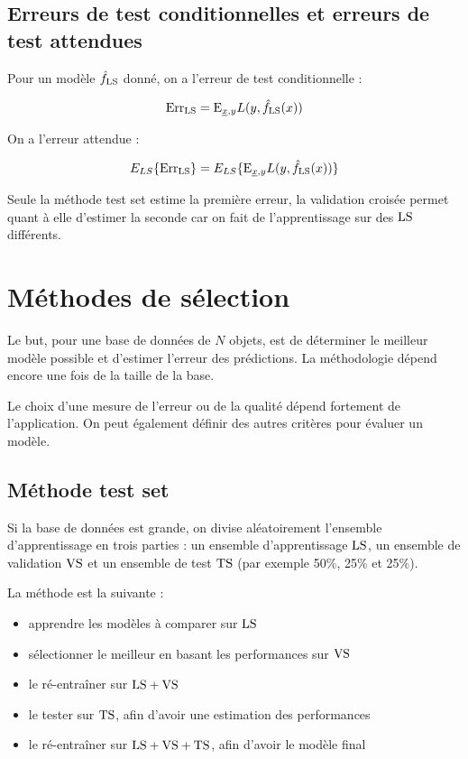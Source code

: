 	\subsection{Erreurs de test conditionnelles et erreurs de test attendues}
	
	Pour un modèle $\hat{f}_{\text{LS}}$ donné, on a l'erreur de test conditionnelle :
	
	$$\text{Err}_{\text{LS}} = \text{E}_{\underline{x}, y}{L(y, \hat{f}_{\text{LS}}(x))}$$
	
	On a l'erreur attendue :
	
	$$E_{LS}\{\text{Err}_{\text{LS}}\} = E_{LS}\{\text{E}_{\underline{x}, y}{L(y, \hat{f}_{\text{LS}}(x))}\}$$
	
	Seule la méthode test set estime la première erreur, la validation croisée permet quant à elle d'estimer la seconde car on fait de l'apprentissage sur des $\text{LS}$ différents.
	
\section{Méthodes de sélection}

Le but, pour une base de données de $N$ objets, est de déterminer le meilleur modèle possible et d'estimer l'erreur des prédictions. La méthodologie dépend encore une fois de la taille de la base.

Le choix d'une mesure de l'erreur ou de la qualité dépend fortement de l'application. On peut également définir des autres critères pour évaluer un modèle.

	\subsection{Méthode test set}
	
	Si la base de données est grande, on divise aléatoirement l'ensemble d'apprentissage en trois parties : un ensemble d'apprentissage $\text{LS}$, un ensemble de validation $\text{VS}$ et un ensemble de test $\text{TS}$ (par exemple 50\%, 25\% et 25\%).
	
	
	La méthode est la suivante :
	
	\begin{itemize}
		\item apprendre les modèles à comparer sur $\text{LS}$
		\item sélectionner le meilleur en basant les performances sur $\text{VS}$
		\item le ré-entraîner sur $\text{LS} + \text{VS}$
		\item le tester sur $\text{TS}$, afin d'avoir une estimation des performances
		\item le ré-entraîner sur $\text{LS} + \text{VS} + \text{TS}$, afin d'avoir le modèle final
	\end{itemize}
	
